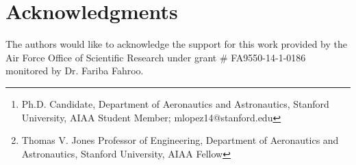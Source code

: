 \documentclass{aiaa-tc}
\author{Manuel R. L\'opez-Morales
         \thanks{Ph.D. Candidate, Department of Aeronautics and Astronautics, Stanford University, AIAA Student Member; mlopez14@stanford.edu}
            and
            Antony Jameson\thanks{Thomas V. Jones Professor of Engineering, Department of Aeronautics and Astronautics, Stanford University, AIAA Fellow} \\
           \normalsize\itshape
         Department of Aeronautics and Astronautics, Stanford University, Stanford, CA, 94305 \vspace{0.1in}
         }
\begin{document}
\vspace{2in}
\maketitle


\vspace{.20in}

% 


\vspace{.20in}


\vspace{.20in}


\vspace{.20in}


\vspace{.20in}

%


\vspace{.20in}


\vspace{.20in}





\section*{Acknowledgments}

The authors would like to acknowledge the support for this work provided by the Air Force Office of Scientific Research under grant \# FA9550-14-1-0186 monitored by Dr. Fariba Fahroo.

%
\vspace{-.05in}






 
\end{document}
